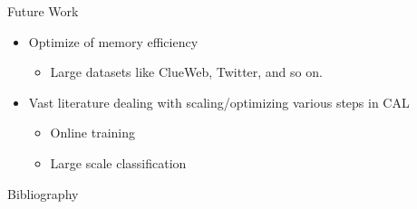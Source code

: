 \documentclass[14pt]{beamer}
\begin{document}
\begin{frame}{Future Work}
\begin{itemize}
    \item Optimize of memory efficiency
        \begin{itemize}
            \item Large datasets like ClueWeb, Twitter, and so on.
        \end{itemize}
    \item Vast literature dealing with scaling/optimizing various steps in CAL
        \begin{itemize}
            \item Online training
            \item Large scale classification
        \end{itemize}
\end{itemize}
\end{frame}
\begin{frame}{Bibliography}
\fontsize{6}{7.2}\selectfont


\end{frame}
\end{document}
